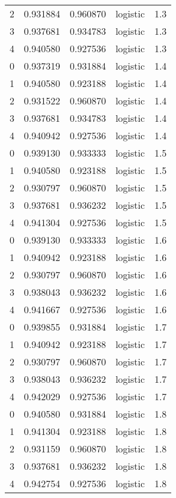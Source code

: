 \begin{tabular}{rrrlr}
     2 & 0.931884 & 0.960870 & logistic &        1.3 \\
     3 & 0.937681 & 0.934783 & logistic &        1.3 \\
     4 & 0.940580 & 0.927536 & logistic &        1.3 \\
     0 & 0.937319 & 0.931884 & logistic &        1.4 \\
     1 & 0.940580 & 0.923188 & logistic &        1.4 \\
     2 & 0.931522 & 0.960870 & logistic &        1.4 \\
     3 & 0.937681 & 0.934783 & logistic &        1.4 \\
     4 & 0.940942 & 0.927536 & logistic &        1.4 \\
     0 & 0.939130 & 0.933333 & logistic &        1.5 \\
     1 & 0.940580 & 0.923188 & logistic &        1.5 \\
     2 & 0.930797 & 0.960870 & logistic &        1.5 \\
     3 & 0.937681 & 0.936232 & logistic &        1.5 \\
     4 & 0.941304 & 0.927536 & logistic &        1.5 \\
     0 & 0.939130 & 0.933333 & logistic &        1.6 \\
     1 & 0.940942 & 0.923188 & logistic &        1.6 \\
     2 & 0.930797 & 0.960870 & logistic &        1.6 \\
     3 & 0.938043 & 0.936232 & logistic &        1.6 \\
     4 & 0.941667 & 0.927536 & logistic &        1.6 \\
     0 & 0.939855 & 0.931884 & logistic &        1.7 \\
     1 & 0.940942 & 0.923188 & logistic &        1.7 \\
     2 & 0.930797 & 0.960870 & logistic &        1.7 \\
     3 & 0.938043 & 0.936232 & logistic &        1.7 \\
     4 & 0.942029 & 0.927536 & logistic &        1.7 \\
     0 & 0.940580 & 0.931884 & logistic &        1.8 \\
     1 & 0.941304 & 0.923188 & logistic &        1.8 \\
     2 & 0.931159 & 0.960870 & logistic &        1.8 \\
     3 & 0.937681 & 0.936232 & logistic &        1.8 \\
     4 & 0.942754 & 0.927536 & logistic &        1.8 \\

\end{tabular}
